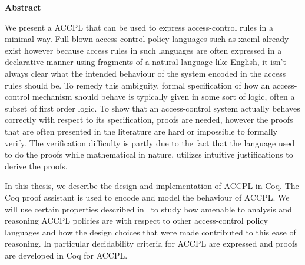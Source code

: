 
\begin{center}\textbf{Abstract}\end{center}

We present a \ac{ACCPL} that can be used to express access-control rules in a minimal way. Full-blown access-control policy languages such as \ac{xacml} already exist however because access rules in such languages are often expressed in a declarative manner using fragments of a natural language like English, it isn't always clear what the intended behaviour of the system encoded in the access rules should be. To remedy this ambiguity, formal specification of how an access-control mechanism should behave is typically given in some sort of logic, often a subset of first order logic. To show that an access-control system actually behaves correctly with respect to its specification, proofs are needed, however the proofs that are often presented in the literature are hard or impossible to formally verify. The verification difficulty is partly due to the fact that the language used to do the proofs while mathematical in nature, utilizes intuitive justifications to derive the proofs. 

In this thesis, we describe the design and implementation of \ac{ACCPL} in Coq. The Coq proof assistant is used to encode and model the behaviour of \ac{ACCPL}. We will use certain properties described in~\cite{Tschantz} to study how amenable to analysis and reasoning \ac{ACCPL} policies are with respect to other access-control policy languages and how the design choices that were made contributed to this ease of reasoning. In particular decidability criteria for \ac{ACCPL} are expressed and proofs are developed in Coq for \ac{ACCPL}.

\cleardoublepage

